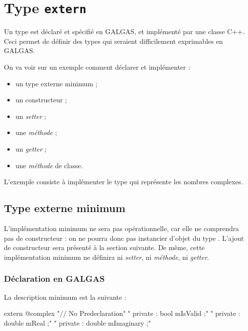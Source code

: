 
\chapter{Type \texttt{extern}}


Un type  est déclaré et spécifié en GALGAS, et implémenté par une classe C++. Ceci permet de définir des types qui seraient difficilement exprimables en GALGAS.

On va voir sur un exemple comment déclarer et implémenter :
\begin{itemize}
  \item un type externe minimum ;
  \item un constructeur ;
  \item un \emph{setter} ;
  \item une \emph{méthode} ;
  \item un \emph{getter} ;
  \item une \emph{méthode} de classe.
\end{itemize}

L'exemple consiste à implémenter le type  qui représente les nombres complexes.

\section{Type externe minimum}

L'implémentation minimum ne sera pas opérationnelle, car elle ne comprendra pas de constructeur : on ne pourra donc pas instancier d'objet du type . L'ajout de constructeur sera présenté à la section suivante. De même, cette implémentation minimum ne définira ni \emph{setter}, ni \emph{méthode}, ni \emph{getter}.


\subsection{Déclaration en GALGAS}

La description minimum est la suivante :
\begin{galgascode}
extern @complex {
  "// No Predeclaration\n"
}{
  "  private : bool mIsValid ;\n"
  "  private : double mReal ;\n"
  "  private : double mImaginary ;\n"
}{
}
\end{galgascode}

